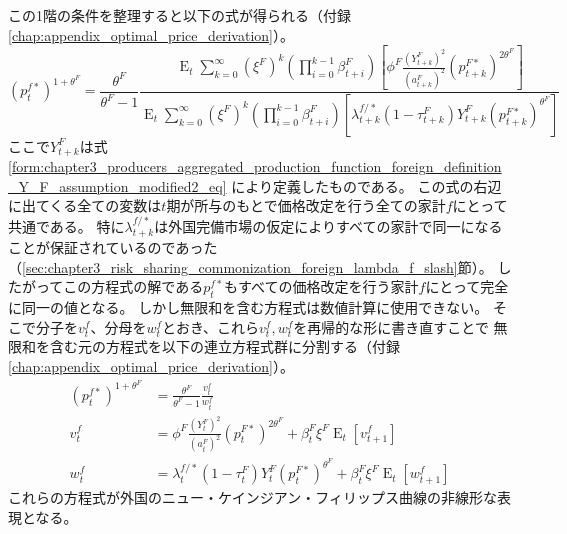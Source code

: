 この1階の条件を整理すると以下の式が得られる（付録\ref{chap:appendix_optimal_price_derivation}）。
\begin{equation}
\label{form:chapter3_producers_stage1_foreign_p_f_star_eq}
    (p_t^{f*})^{1+\theta^F}=\frac{\theta^F}{\theta^F-1}\frac{\operatorname{E}_t\sum_{k=0}^{\infty}(\xi^F)^k\left(\prod_{i=0}^{k-1}\beta_{t+i}^F\right)\left[\phi^F\frac{(Y_{t+k}^F)^2}{(a_{t+k}^F)^2}(p_{t+k}^{F*})^{2\theta^F}\right]}{\operatorname{E}_t\sum_{k=0}^{\infty}(\xi^F)^k\left(\prod_{i=0}^{k-1}\beta_{t+i}^F\right)\left[\lambda_{t+k}^{f/*}(1-\tau_{t+k}^F)Y_{t+k}^F(p_{t+k}^{F*})^{\theta^F}\right]}
\end{equation}
ここで\(Y_{t+k}^F\)は式
\eqref{form:chapter3_producers_aggregated_production_function_foreign_definition_Y_F_assumption_modified2_eq}
により定義したものである。
この式の右辺に出てくる全ての変数は\(t\)期が所与のもとで価格改定を行う全ての家計\(f\)にとって共通である。
特に\(\lambda_{t+k}^{f/*}\)は外国完備市場の仮定によりすべての家計で同一になることが保証されているのであった
（\ref{sec:chapter3_risk_sharing_commonization_foreign_lambda_f_slash}節）。
したがってこの方程式の解である\(p_t^{f*}\)もすべての価格改定を行う家計\(f\)にとって完全に同一の値となる。
しかし無限和を含む方程式は数値計算に使用できない。
そこで分子を\(v_t^f\)、分母を\(w_t^f\)とおき、これら\(v_t^f, w_t^f\)を再帰的な形に書き直すことで
無限和を含む元の方程式を以下の連立方程式群に分割する（付録\ref{chap:appendix_optimal_price_derivation}）。
\begin{align}
    \label{form:chapter3_producers_stage1_foreign_p_f_star_modified_eq}
        (p_t^{f*})^{1+\theta^F}&=\frac{\theta^F}{\theta^F-1}\frac{v_t^f}{w_t^f} \\
    \label{form:chapter3_producers_stage1_foreign_v_f_eq}
        v_t^f&=\phi^F\frac{(Y_t^F)^2}{(a_t^F)^2}(p_t^{F*})^{2\theta^F}+\beta_t^F\xi^F\operatorname{E}_t[v_{t+1}^f] \\
    \label{form:chapter3_producers_stage1_foreign_w_f_eq}
        w_t^f&=\lambda_t^{f/*}(1-\tau_t^F)Y_t^F(p_t^{F*})^{\theta^F}+\beta_t^F\xi^F\operatorname{E}_t[w_{t+1}^f]
\end{align}
これらの方程式が外国のニュー・ケインジアン・フィリップス曲線の非線形な表現となる。